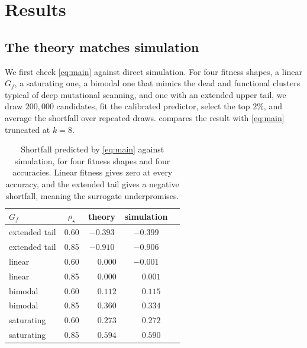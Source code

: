 \documentclass{article}
\theoremstyle{plain}
\theoremstyle{definition}
\begin{document}
\section{Results}
\label{sec:results}

\subsection{The theory matches simulation}
\label{sec:results-sim}

We first check \cref{eq:main} against direct simulation. For four fitness shapes, a
linear $G_{\!f}$, a saturating one, a bimodal one that mimics the dead and functional
clusters typical of deep mutational scanning, and one with an extended upper tail, we
draw $200{,}000$ candidates, fit the calibrated predictor, select the top $2\%$, and
average the shortfall over repeated draws.  compares the result with
\cref{eq:main} truncated at $k=8$.

\begin{table}[t]
\caption{Shortfall predicted by \cref{eq:main} against simulation, for four fitness
shapes and four accuracies. Linear fitness gives zero at every accuracy, and the
extended tail gives a negative shortfall, meaning the surrogate underpromises.}
\label{tab:theory}
\vskip 0.1in
\begin{center}
\begin{small}
\begin{tabular}{lcccc}
\toprule
$G_{\!f}$ & $\rho_\star$ & theory & simulation \\
\midrule
extended tail & 0.60 & $-0.393$ & $-0.399$ \\
extended tail & 0.85 & $-0.910$ & $-0.906$ \\
linear        & 0.60 & $\phantom{-}0.000$ & $-0.001$ \\
linear        & 0.85 & $\phantom{-}0.000$ & $\phantom{-}0.001$ \\
bimodal       & 0.60 & $\phantom{-}0.112$ & $\phantom{-}0.115$ \\
bimodal       & 0.85 & $\phantom{-}0.360$ & $\phantom{-}0.334$ \\
saturating    & 0.60 & $\phantom{-}0.273$ & $\phantom{-}0.272$ \\
saturating    & 0.85 & $\phantom{-}0.594$ & $\phantom{-}0.590$ \\
\bottomrule
\end{tabular}
\end{small}
\end{center}
\vskip -0.1in
\end{table}
\end{document}
